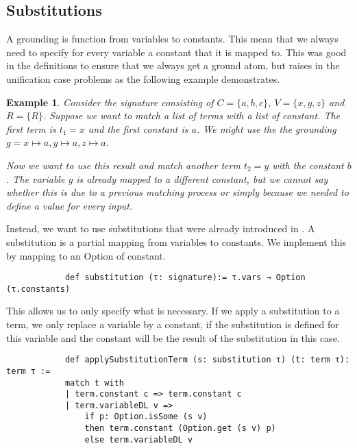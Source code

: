 \documentclass{article}
\newtheorem{example}{Example}
\begin{document}
        
        \subsection{Substitutions}
            A grounding is function from variables to constants. This mean that we always need to specify for every variable a constant that it is mapped to. This was good in the definitions to ensure that we always get a ground atom, but raises in the unification case problems as the following example demonstrates.

            \begin{example}
                Consider the signature consisting of $C = \{a,b,c\}$, $V = \{x,y,z \}$ and $R = \{R\}$. Suppose we want to match a list of terms with a list of constant. The first term is $t_1 = x$ and the first constant is $a$. We might use the the grounding $g = x \mapsto a, y \mapsto a, z \mapsto a$.

                Now we want to use this result and match another term $t_2 = y$ with the constant $b$. The variable $y$ is already mapped to a different constant, but we cannot say whether this is due to a previous matching process or simply because we needed to define a value for every input.
                

                
            \end{example}

            Instead, we want to use substitutions that were already introduced in \cite{datalogCoq}. A substitution is a partial mapping from variables to constants. We implement this by mapping to an Option of constant.

            \begin{lstlisting}
            def substitution (τ: signature):= τ.vars → Option (τ.constants)
            \end{lstlisting}

            This allows us to only specify what is necessary. If we apply a substitution to a term, we only replace a variable by a constant, if the substitution is defined for this variable and the constant will be the result of the substitution in this case.

            \begin{lstlisting}
            def applySubstitutionTerm (s: substitution τ) (t: term τ): term τ :=
            match t with
            | term.constant c => term.constant c
            | term.variableDL v => 
                if p: Option.isSome (s v) 
                then term.constant (Option.get (s v) p) 
                else term.variableDL v
            \end{lstlisting}
\end{document}

